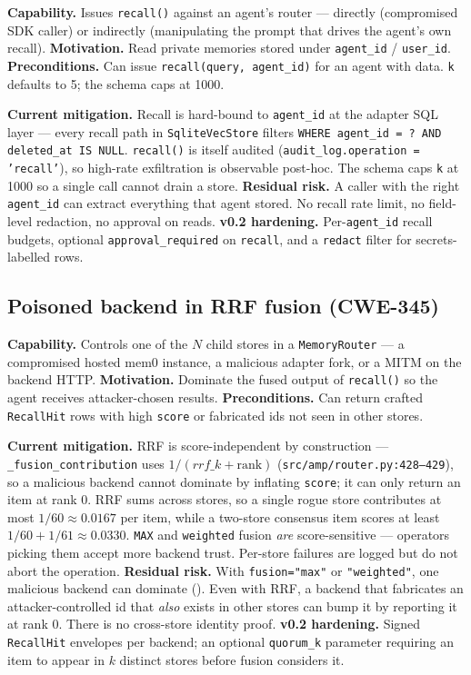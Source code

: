 \documentclass[11pt,letterpaper,twocolumn]{article}
\begin{document}
\textbf{Capability.} Issues \texttt{recall()} against an agent's router --- directly (compromised SDK caller) or indirectly (manipulating the prompt that drives the agent's own recall). \textbf{Motivation.} Read private memories stored under \texttt{agent\_id} / \texttt{user\_id}. \textbf{Preconditions.} Can issue \texttt{recall(query, agent\_id)} for an agent with data. \texttt{k} defaults to 5; the schema caps at 1000.

\textbf{Current mitigation.} Recall is hard-bound to \texttt{agent\_id} at the adapter SQL layer --- every recall path in \texttt{SqliteVecStore} filters \texttt{WHERE agent\_id = ? AND deleted\_at IS NULL}. \texttt{recall()} is itself audited (\texttt{audit\_log.operation = 'recall'}), so high-rate exfiltration is observable post-hoc. The schema caps \texttt{k} at 1000 so a single call cannot drain a store. \textbf{Residual risk.} A caller with the right \texttt{agent\_id} can extract everything that agent stored. No recall rate limit, no field-level redaction, no approval on reads. \textbf{v0.2 hardening.} Per-\texttt{agent\_id} recall budgets, optional \texttt{approval\_required} on \texttt{recall}, and a \texttt{redact} filter for secrets-labelled rows.

\subsection{Poisoned backend in RRF fusion (CWE-345)}
\label{sec:threats-poisoned}

\textbf{Capability.} Controls one of the $N$ child stores in a \texttt{MemoryRouter} --- a compromised hosted mem0 instance, a malicious adapter fork, or a MITM on the backend HTTP. \textbf{Motivation.} Dominate the fused output of \texttt{recall()} so the agent receives attacker-chosen results. \textbf{Preconditions.} Can return crafted \texttt{RecallHit} rows with high \texttt{score} or fabricated ids not seen in other stores.

\textbf{Current mitigation.} RRF is score-independent by construction --- \texttt{\_fusion\_contribution} uses $1 / (\mathit{rrf\_k} + \mathrm{rank})$ (\texttt{src/amp/router.py:428--429}), so a malicious backend cannot dominate by inflating \texttt{score}; it can only return an item at rank 0. RRF sums across stores, so a single rogue store contributes at most $1/60 \approx 0.0167$ per item, while a two-store consensus item scores at least $1/60 + 1/61 \approx 0.0330$. \texttt{MAX} and \texttt{weighted} fusion \emph{are} score-sensitive --- operators picking them accept more backend trust. Per-store failures are logged but do not abort the operation. \textbf{Residual risk.} With \texttt{fusion="max"} or \texttt{"weighted"}, one malicious backend can dominate (). Even with RRF, a backend that fabricates an attacker-controlled id that \emph{also} exists in other stores can bump it by reporting it at rank 0. There is no cross-store identity proof. \textbf{v0.2 hardening.} Signed \texttt{RecallHit} envelopes per backend; an optional \texttt{quorum\_k} parameter requiring an item to appear in $k$ distinct stores before fusion considers it.
\end{document}
